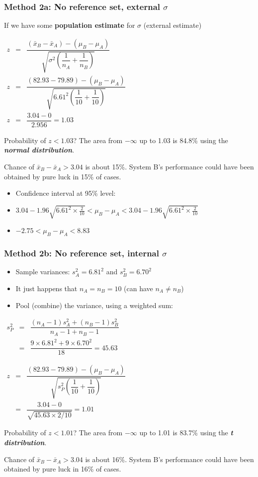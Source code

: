 \begin{frame}\frametitle{Method 2a: No reference set, external $\sigma$}

	If we have some \textbf{population estimate} for $\sigma$ (external estimate)

	$
	\begin{array}{rcl}
		z &=& \dfrac{(\bar{x}_B - \bar{x}_A) - (\mu_B - \mu_A)}{\sqrt{\sigma^2 \left( \dfrac{1}{n_A} + \dfrac{1}{n_B}\right)}} \\
		z &=& \dfrac{(82.93-79.89) - (\mu_B - \mu_A)}{\sqrt{6.61^2 \left( \dfrac{1}{10} + \dfrac{1}{10}\right)}} \\
		z &=& \dfrac{3.04 - 0}{2.956} = 1.03
	\end{array}
	$

	Probability of $z < 1.03$? The area from $-\infty$ up to 1.03 is 84.8\% using the \textbf{\emph{normal distribution}}.

	Chance of $\bar{x}_B - \bar{x}_A > 3.04$ is about 15\%. System B's performance could have been obtained by pure luck in 15\% of cases.
	\begin{itemize}
		\item Confidence interval at 95\% level:
		\item$3.04 - 1.96 \sqrt{6.61^2 \times \frac{2}{10}} < \mu_B - \mu_A < 3.04 - 1.96 \sqrt{6.61^2 \times \frac{2}{10}}$
		\item$-2.75 < \mu_B - \mu_A < 8.83$
	\end{itemize}
\end{frame}

\begin{frame}\frametitle{Method 2b: No reference set, internal $\sigma$}
	\begin{itemize}
		\item Sample variances: $s_A^2 = 6.81^2$ and $s_B^2 = 6.70^2$
		\item It just happens that $n_A = n_B = 10$ (can have $n_A \neq n_B$)
		\item Pool (combine) the variance, using a weighted sum:
	\end{itemize}

	$
	\begin{array}{rcccl}
		s_P^2 &=& \dfrac{(n_A -1) s_A^2 + (n_B-1)s_B^2}{n_A - 1 + n_B - 1} \\
		&=& \dfrac{9\times 6.81^2 + 9 \times 6.70^2}{18} = 45.63
	\end{array}
	$

	$
	\begin{array}{rcccl}
		z &=& \dfrac{(82.93 - 79.89) - (\mu_B - \mu_A)}{\sqrt{s_P^2 \left(\dfrac{1}{10} + \dfrac{1}{10}\right)}} \\
		&=& \dfrac{3.04 - 0}{\sqrt{45.63 \times 2/10}} = 1.01
	\end{array}
	$

	Probability of $z < 1.01$? The area from $-\infty$ up to 1.01 is 83.7\% using the \textbf{\emph{t distribution}}.

	Chance of $\bar{x}_B - \bar{x}_A > 3.04$ is about 16\%. System B's performance could have been obtained by pure luck in 16\% of cases.
\end{frame}

